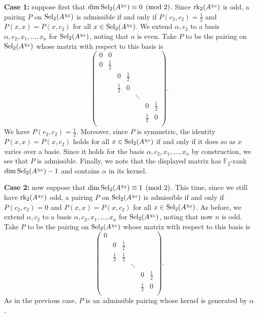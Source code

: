 \documentclass[10pt]{amsart}
\numberwithin{equation}{section}
\theoremstyle{remark}
\theoremstyle{definition}
\theoremstyle{definition}
\theoremstyle{definition}
\theoremstyle{definition}
\theoremstyle{definition}
\theoremstyle{definition}
\theoremstyle{definition}
\theoremstyle{definition}
\begin{document}
\textbf{Case 1:} suppose first that $\dim \textup{Sel}_2(A^{\chi_0})\equiv 0 \pmod 2$. Since $\textup{rk}_2(A^{\chi_0})$ is odd, a pairing $P$ on $\textup{Sel}_2(A^{\chi_0})$ is admissible if and only if $P(c_2,c_2)=\tfrac{1}{2}$ and $P(x,x)=P(x,c_2)$ for all $x\in \textup{Sel}_2(A^{\chi_0})$.   We extend $\alpha, c_2$ to a basis $\alpha, c_2, x_1,...,x_n$ for $\textup{Sel}_2(A^{\chi_0})$, noting that $n$ is even. Take $P$ to be the pairing on $\textup{Sel}_2(A^{\chi_0})$ whose matrix with respect to this basis is
\[
\left(\begin{array}{ccccccc}
0 & 0 &&  \\
0 & \tfrac{1}{2}&&  \\
 &  & 0&\tfrac{1}{2} \\
 &&\tfrac{1}{2}&0\\
 &&&& \ddots\\
  &  &&&& 0&\tfrac{1}{2} \\
 &&&&&\tfrac{1}{2}&0\\
\end{array}\right).\]
We have $P(c_2,c_2)=\tfrac{1}{2}$. Moreover, since $P$ is symmetric, the identity $P(x,x)=P(x,c_2)$ holds for all $x\in \textup{Sel}_2(A^{\chi_0})$ if and only if it does so as $x$ varies over a basis. Since it holds for the basis $\alpha, c_2, x_1,...,x_n$ by construction, we see that $P$ is admissible. Finally, we note that the displayed matrix has $\mathbb{F}_2$-rank $\dim  \textup{Sel}_2(A^{\chi_0}) -1$ and contains $\alpha$ in its kernel. 

\textbf{Case 2:} now suppose that  $\dim \textup{Sel}_2(A^{\chi_0})\equiv 1 \pmod 2$. This time, since we still have $\textup{rk}_2(A^{\chi_0})$  odd, a pairing $P$ on $\textup{Sel}_2(A^{\chi_0})$ is admissible if and only if $P(c_2,c_2)=0$ and $P(x,x)=P(x,c_2)$ for all $x\in \textup{Sel}_2(A^{\chi_0})$.  As before, we extend $\alpha, c_2$ to a basis $\alpha, c_2, x_1,...,x_n$ for $\textup{Sel}_2(A^{\chi_0})$, noting that now $n$ is odd. Take $P$ to be the pairing on $\textup{Sel}_2(A^{\chi_0})$ whose matrix with respect to this basis is
 \[
\left(\begin{array}{ccccccc}
 0&&  \\
   & 0&\tfrac{1}{2} \\
 &\tfrac{1}{2}&\tfrac{1}{2}\\
 &&& \ddots\\
    &&&& 0&\tfrac{1}{2} \\
 &&&&\tfrac{1}{2}&0\\
\end{array}\right).\]
As in the previous case, $P$ is an admissible pairing whose kernel is generated by $\alpha$. 
 
\end{document}
